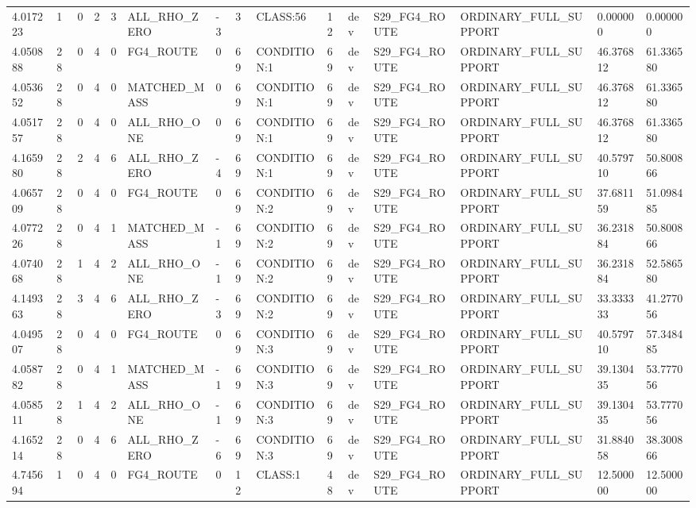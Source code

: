 \begin{tabular}{lllllllllllllll}
4.017223 & 1 & 0 & 2 & 3 & ALL\_RHO\_ZERO & -3 & 3 & CLASS:56 & 12 & dev & S29\_FG4\_ROUTE & ORDINARY\_FULL\_SUPPORT & 0.000000 & 0.000000 \\
4.050888 & 28 & 0 & 4 & 0 & FG4\_ROUTE & 0 & 69 & CONDITION:1 & 69 & dev & S29\_FG4\_ROUTE & ORDINARY\_FULL\_SUPPORT & 46.376812 & 61.336580 \\
4.053652 & 28 & 0 & 4 & 0 & MATCHED\_MASS & 0 & 69 & CONDITION:1 & 69 & dev & S29\_FG4\_ROUTE & ORDINARY\_FULL\_SUPPORT & 46.376812 & 61.336580 \\
4.051757 & 28 & 0 & 4 & 0 & ALL\_RHO\_ONE & 0 & 69 & CONDITION:1 & 69 & dev & S29\_FG4\_ROUTE & ORDINARY\_FULL\_SUPPORT & 46.376812 & 61.336580 \\
4.165980 & 28 & 2 & 4 & 6 & ALL\_RHO\_ZERO & -4 & 69 & CONDITION:1 & 69 & dev & S29\_FG4\_ROUTE & ORDINARY\_FULL\_SUPPORT & 40.579710 & 50.800866 \\
4.065709 & 28 & 0 & 4 & 0 & FG4\_ROUTE & 0 & 69 & CONDITION:2 & 69 & dev & S29\_FG4\_ROUTE & ORDINARY\_FULL\_SUPPORT & 37.681159 & 51.098485 \\
4.077226 & 28 & 0 & 4 & 1 & MATCHED\_MASS & -1 & 69 & CONDITION:2 & 69 & dev & S29\_FG4\_ROUTE & ORDINARY\_FULL\_SUPPORT & 36.231884 & 50.800866 \\
4.074068 & 28 & 1 & 4 & 2 & ALL\_RHO\_ONE & -1 & 69 & CONDITION:2 & 69 & dev & S29\_FG4\_ROUTE & ORDINARY\_FULL\_SUPPORT & 36.231884 & 52.586580 \\
4.149363 & 28 & 3 & 4 & 6 & ALL\_RHO\_ZERO & -3 & 69 & CONDITION:2 & 69 & dev & S29\_FG4\_ROUTE & ORDINARY\_FULL\_SUPPORT & 33.333333 & 41.277056 \\
4.049507 & 28 & 0 & 4 & 0 & FG4\_ROUTE & 0 & 69 & CONDITION:3 & 69 & dev & S29\_FG4\_ROUTE & ORDINARY\_FULL\_SUPPORT & 40.579710 & 57.348485 \\
4.058782 & 28 & 0 & 4 & 1 & MATCHED\_MASS & -1 & 69 & CONDITION:3 & 69 & dev & S29\_FG4\_ROUTE & ORDINARY\_FULL\_SUPPORT & 39.130435 & 53.777056 \\
4.058511 & 28 & 1 & 4 & 2 & ALL\_RHO\_ONE & -1 & 69 & CONDITION:3 & 69 & dev & S29\_FG4\_ROUTE & ORDINARY\_FULL\_SUPPORT & 39.130435 & 53.777056 \\
4.165214 & 28 & 0 & 4 & 6 & ALL\_RHO\_ZERO & -6 & 69 & CONDITION:3 & 69 & dev & S29\_FG4\_ROUTE & ORDINARY\_FULL\_SUPPORT & 31.884058 & 38.300866 \\
4.745694 & 1 & 0 & 4 & 0 & FG4\_ROUTE & 0 & 12 & CLASS:1 & 48 & dev & S29\_FG4\_ROUTE & ORDINARY\_FULL\_SUPPORT & 12.500000 & 12.500000 \\

\end{tabular}
